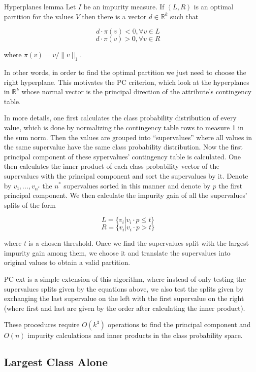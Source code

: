 \begin{theorem}{Hyperplanes lemma}
 Let $I$ be an impurity measure. If $(L, R)$ is an optimal partition for the values $V$ then there is a vector $d \in \mathbb{R}^k$ such that
 
 $$d\cdot\pi(v) < 0, \forall v \in L$$
 $$d\cdot\pi(v) > 0, \forall v \in R$$
 
 where $\pi(v) = v / \lVert v \rVert_1$.
\end{theorem}


In other words, in order to find the optimal partition we just need to choose the right hyperplane. This motivates the PC criterion, which look at the hyperplanes in $\mathbb{R}^k$ whose normal vector is the principal direction of the attribute's contingency table.

In more details, one first calculates the class probability distribution of every value, which is done by normalizing the contingency table rows to measure 1 in the sum norm. Then the values are grouped into ``supervalues'' where all values in the same supervalue have the same class probability distribution. Now the first principal component of these sypervalues' contingency table is calculated. One then calculates the inner product of each class probability vector of the supervalues  with the principal component and sort the supervalues by it. Denote by $v_1,\ldots,v_{n^*}$ the $n^*$ supervalues sorted in this manner and denote by $p$ the first principal component. We then calculate the impurity gain of all the supervalues' splits of the form

$$L = \{v_i | v_i \cdot p \leq t\}$$
$$R = \{v_i | v_i \cdot p > t\}$$

where $t$ is a chosen threshold. Once we find the supervalues split with the largest impurity gain among them, we choose it and translate the supervalues into original values to obtain a valid partition.

PC-ext is a simple extension of this algorithm, where instead of only testing the supervalues splits given by the equations above, we also test the splits given by  exchanging the last supervalue on the left with the first supervalue on the right (where first and last are given by the order after calculating the inner product).

These procedures require $O(k^3)$ operations to find the principal component and $O(n)$ impurity calculations and inner products in the class probability space.

\subsection{Largest Class Alone}


